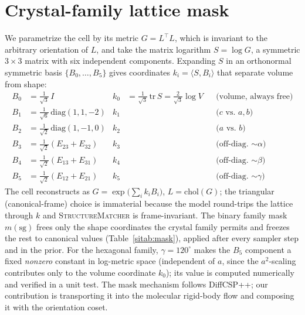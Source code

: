 \documentclass[journal=jcisd8,manuscript=suppinfo]{achemso}
\begin{document}
\section{Crystal-family lattice mask}\label{sisec:family}
We parametrize the cell by its metric $G=L^\top L$, which is invariant to the
arbitrary orientation of $L$, and take the matrix logarithm $S=\log G$, a symmetric
$3\times3$ matrix with six independent components. Expanding $S$ in an orthonormal
symmetric basis $\{B_0,\dots,B_5\}$ gives coordinates $k_i=\langle S,B_i\rangle$
that separate volume from shape:
\begin{align*}
B_0 &= \tfrac{1}{\sqrt3}\,I               & k_0 &= \tfrac{1}{\sqrt3}\,\mathrm{tr}\,S = \tfrac{2}{\sqrt3}\log V &&\text{(volume, always free)}\\
B_1 &= \tfrac{1}{\sqrt6}\,\mathrm{diag}(1,1,-2) & k_1 &&&\text{($c$ vs.\ $a,b$)}\\
B_2 &= \tfrac{1}{\sqrt2}\,\mathrm{diag}(1,-1,0)  & k_2 &&&\text{($a$ vs.\ $b$)}\\
B_3 &= \tfrac{1}{\sqrt2}(E_{23}+E_{32})   & k_3 &&&\text{(off-diag.\ $\sim\!\alpha$)}\\
B_4 &= \tfrac{1}{\sqrt2}(E_{13}+E_{31})   & k_4 &&&\text{(off-diag.\ $\sim\!\beta$)}\\
B_5 &= \tfrac{1}{\sqrt2}(E_{12}+E_{21})   & k_5 &&&\text{(off-diag.\ $\sim\!\gamma$)}
\end{align*}
The cell reconstructs as $G=\exp\big(\sum_i k_i B_i\big)$, $L=\mathrm{chol}(G)$; the
triangular (canonical-frame) choice is immaterial because the model round-trips the
lattice through $k$ and \textsc{StructureMatcher} is frame-invariant. The binary
family mask $m(\mathrm{sg})$ frees only the shape coordinates the crystal family
permits and freezes the rest to canonical values (Table~\ref{sitab:mask}), applied
after every sampler step and in the prior. For the hexagonal family,
$\gamma=120^\circ$ makes the $B_5$ component a fixed \emph{nonzero} constant in
log-metric space (independent of $a$, since the $a^2$-scaling contributes only to
the volume coordinate $k_0$); its value is computed numerically and verified in a
unit test. The mask mechanism follows DiffCSP++\cite{jiao2024diffcsppp}; our
contribution is transporting it into the molecular rigid-body flow and composing it
with the orientation coset.
\end{document}
